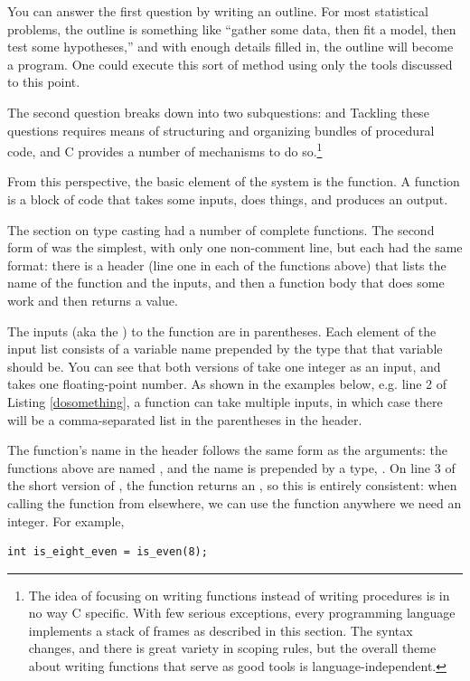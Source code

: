 You can answer the first question by writing an outline. For most
statistical problems, the outline is something like ``gather some data,
then fit a model, then test some hypotheses,'' and with enough details
filled in, the outline will become a program. One could execute this
sort of method using only the tools discussed to this point.

The second question breaks down into two subquestions:  and 
Tackling these questions requires means of structuring and organizing
bundles of procedural code, and C provides a number of mechanisms to
do so.\footnote{The idea of focusing on writing functions instead of
writing procedures is in no way C specific. With few serious exceptions,
every programming language implements a stack of frames as described in
this section. The syntax changes, and there is great variety in 
scoping rules, but the overall theme about writing functions that
serve as good tools is language-independent.}

From this perspective, the basic element of the system is the function.
A function is a block of code that takes some inputs, does things,
and produces an output. 

The section on type casting had a number of complete functions. The
second form of  was the simplest, with only one 
non-comment line, but each had the same format: there is a header (line
one in each of the functions above) that lists the name of the function
and the inputs, and then a function body that does some work and then
returns a value.

The inputs (aka the ) to the function
are in parentheses. Each element of the input
list consists of a variable name prepended by the type that that
variable should be. You can see that both versions of 
take one integer as an input, and
 takes one floating-point number.
As shown in the examples below, e.g. line 2 of Listing \ref{dosomething}, a
function can take multiple inputs, in which case there will be a
comma-separated list in the parentheses in the header.

The function's name in the header follows the same form as the arguments:
the functions above are named , and the name is prepended by a type,
.  On line 3 of the short version of , the function returns
an , so this is entirely consistent: when calling the
function from elsewhere, we can use the function anywhere we need an
integer. For example,
\begin{lstlisting}
int is_eight_even = is_even(8);
\end{lstlisting}


